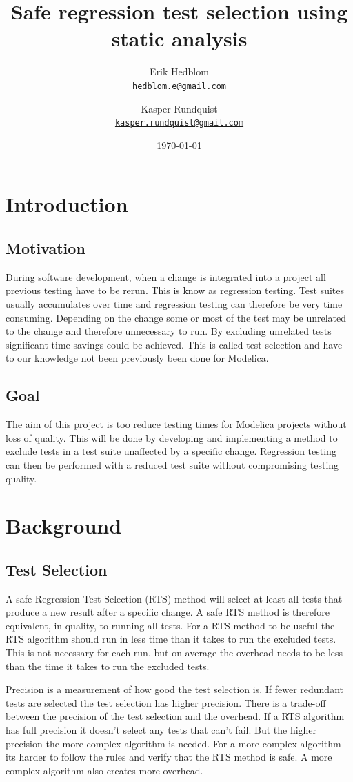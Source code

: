 \documentclass{cslthse-msc}
\author{
	Erik Hedblom \\
	{\normalsize \href{mailto:hedblom.e@gmail.com}{\texttt{hedblom.e@gmail.com}}}
	\and
	Kasper Rundquist \\
	{\normalsize \href{mailto:kasper.rundquist@gmail.com}{\texttt{kasper.rundquist@gmail.com}}}
}
\title{Safe regression test selection using static analysis}
\date{\today}
\begin{document}
\makefrontmatter
\chapter[Introduction]{Introduction}

\section{Motivation}
During software development, when a change is integrated into a project all previous testing have to be rerun. This is know as regression testing. Test suites usually accumulates over time and regression testing can therefore be very time consuming. Depending on the change some or most of the test may be unrelated to the change and therefore unnecessary to run. By excluding unrelated tests significant time savings could be achieved. This is called test selection and have to our knowledge not been previously been done for Modelica. 


\section{Goal}
The aim of this project is too reduce testing times for Modelica projects without loss of quality. This will be done by developing and implementing a method to exclude tests in a test suite unaffected by a specific change. Regression testing can then be performed with a reduced test suite without compromising testing quality.


\chapter[Background]{Background}
\section{Test Selection}
A safe Regression Test Selection (RTS) method will select at least all tests that produce a new result after a specific change. A safe RTS method is therefore equivalent, in quality, to running all tests. For a RTS method to be useful the RTS algorithm should run in less time than it takes to run the excluded tests. This is not necessary for each run, but on average the overhead needs to be less than the time it takes to run the excluded tests.

Precision is a measurement of how good the test selection is. If fewer redundant tests are selected the test selection has higher precision. There is a trade-off between the precision of the test selection and the overhead. If a RTS algorithm has full precision it doesn't select any tests that can't fail. But the higher precision the more complex algorithm is needed. For a more complex algorithm its harder to follow the rules and verify that the RTS method is safe. A more complex algorithm also creates more overhead.
\end{document}
